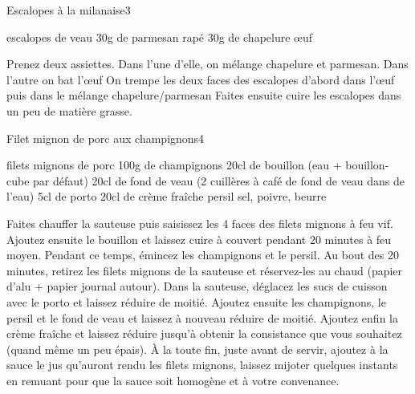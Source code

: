 \begin{recette}{Escalopes à la milanaise}{3}{}{}
\begin{ingredients}
 escalopes de veau
\ingredient 30g de parmesan rapé
\ingredient 30g de chapelure
 œuf
\end{ingredients}

\begin{preparation}
\etape Prenez deux assiettes. Dans l'une d'elle, on mélange chapelure et parmesan. Dans l'autre on bat l'œuf
\etape On trempe les deux faces des escalopes d'abord dans l'œuf puis dans le mélange chapelure/parmesan
\etape Faites ensuite cuire les escalopes dans un peu de matière grasse.
\end{preparation}
\end{recette}

\begin{recette}{Filet mignon de porc aux champignons}{4}{}{}
\begin{ingredients}
 filets mignons de porc
\ingredient 100g de champignons
\ingredient 20cl de bouillon (eau + bouillon-cube par défaut)
\ingredient 20cl de fond de veau (2 cuillères à café de fond de veau dans de l'eau)
\ingredient 5cl de porto
\ingredient 20cl de crème fraîche
\ingredient persil
\ingredient sel, poivre, beurre
\end{ingredients}

\begin{preparation}
\etape Faites chauffer la sauteuse puis saisissez les 4 faces des filets mignons à feu vif. Ajoutez ensuite le bouillon et laissez cuire à couvert pendant 20 minutes à feu moyen.
\etape Pendant ce temps, émincez les champignons et le persil.
\etape Au bout des 20 minutes, retirez les filets mignons de la sauteuse et réservez-les au chaud (papier d'alu + papier journal autour). Dans la sauteuse, déglacez les sucs de cuisson avec le porto et laissez réduire de moitié.
\etape Ajoutez ensuite les champignons, le persil et le fond de veau et laissez à nouveau réduire de moitié.
\etape Ajoutez enfin la crème fraîche et laissez réduire jusqu'à obtenir la consistance que vous souhaitez (quand même un peu épais).
\etape À la toute fin, juste avant de servir, ajoutez à la sauce le jus qu'auront rendu les filets mignons, laissez mijoter quelques instants en remuant pour que la sauce soit homogène et à votre convenance.
\end{preparation}

\end{recette}

